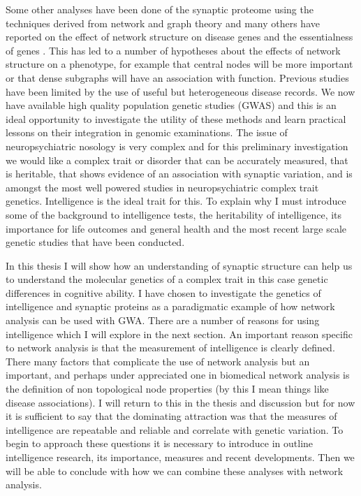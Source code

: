 Some other analyses have been done of the synaptic proteome using the techniques derived from network and graph theory \cite{pocklington2006organization}\cite{mclean2016improved} and many others have reported on the effect of network structure on disease genes \cite{barabasi2011network} and the essentialness of genes \cite{jeong2001lethality}. This has led to a number of hypotheses about the effects of network structure on a phenotype, for example that central nodes will be more important or that dense subgraphs will have an association with function. Previous studies have been limited by the use of useful but heterogeneous disease records. We now have available high quality population genetic studies (GWAS) and this is an ideal opportunity to investigate the utility of these methods and learn practical lessons on their integration in genomic examinations. The issue of neuropsychiatric nosology is very complex and for this preliminary investigation we would like a complex trait or disorder that can be accurately measured, that is heritable, that shows evidence of an association with synaptic variation, and is amongst the most well powered studies in neuropsychiatric complex trait genetics. Intelligence is the ideal trait for this. To explain why I must introduce some of the background to intelligence tests, the heritability of intelligence, its importance for life outcomes and general health and the most recent large scale genetic studies that have been conducted.

In this thesis I will show how an understanding of synaptic structure can help us to understand the molecular genetics of a complex trait in this case genetic differences in cognitive ability. I have chosen to investigate the genetics of intelligence and synaptic proteins as a paradigmatic example of how network analysis can be used with GWA. There are a number of reasons for using intelligence which I will explore in the next section. An important reason specific to network analysis is that the measurement of intelligence is clearly defined. There  many factors that complicate the use of network analysis but an important, and perhaps under appreciated one in biomedical network analysis is the definition of non topological node properties (by this I mean things like disease associations). I will return to this in the thesis and discussion but for now it is sufficient to say that the dominating attraction was that the measures of intelligence are repeatable and reliable and correlate with genetic variation. To begin to approach these questions it is necessary to introduce in outline intelligence research, its importance, measures and recent developments. Then we will be able to conclude with how we can combine these analyses with network analysis.%


